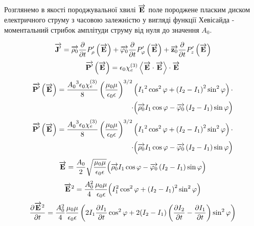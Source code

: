 Розглянемо в якості породжувальної хвилі $ \overrightarrow{\mathbf E} $ поле породжене 
пласким диском електричного струму з часовою залежністю у вигляді 
функції Хевісайда - моментальний стрибок амплітуди струму від нуля до 
значення $ A_0 $.

\textcolor{blue}{ \begin{equation*} 
\overrightarrow{\mathbf J^\prime} = 
\overrightarrow{\mathbf \rho_0}    \frac{\partial }{\partial t} P_\rho^\prime    \left( \overrightarrow{\mathbf E} \right) + 
\overrightarrow{\mathbf \varphi_0} \frac{\partial }{\partial t} P_\varphi^\prime \left( \overrightarrow{\mathbf E} \right) + 
\overrightarrow{\mathbf z_0}       \frac{\partial }{\partial t} P_z^\prime       \left( \overrightarrow{\mathbf E} \right) 
\end{equation*} }
%
\textcolor{blue}{ \begin{equation*}
\overrightarrow{\mathbf P^\prime} \left( \overrightarrow{\mathbf E} \right) = \epsilon_0 \chi_e^{(3)} 
\left<  \overrightarrow{\mathbf E}  \cdot  \overrightarrow{\mathbf E}  \right> \cdot \overrightarrow{\mathbf E} 
\end{equation*} }
%
\textcolor{blue}{ \begin{equation*} \begin{aligned}
\overrightarrow{\mathbf P^\prime} \left( \overrightarrow{\mathbf E} \right) = 
\frac{ {A_0}^3 \epsilon_0 \chi_e^{(3)} }{ 8 } \left( \frac{\mu_0 \mu}
{\epsilon_0 \epsilon} \right)^{3/2} \left( {I_1}^2 \cos^2 \varphi + 
\left( I_2 - I_1 \right)^2 \sin^2 \varphi \right) \cdot \\ 
\cdot \Big( \overrightarrow{\mathbf \rho_0} I_1 \cos \varphi - 
\overrightarrow{\mathbf  \varphi_0 } \left( I_2 - I_1 \right) \sin \varphi \Big)
\end{aligned} \end{equation*} }
%
\textcolor{blue}{ \begin{equation*} \begin{aligned}
\overrightarrow{\mathbf P^\prime} \left( \overrightarrow{\mathbf E} \right) = 
\frac{ {A_0}^3 \epsilon_0 \chi_e^{(3)} }{ 8 } \left( \frac{\mu_0 \mu}
{\epsilon_0 \epsilon} \right)^{3/2} \left( {I_1}^2 \cos^2 \varphi + 
\left( I_2 - I_1 \right)^2 \sin^2 \varphi \right) \cdot \\ 
\cdot \Big( \overrightarrow{\mathbf \rho_0} I_1 \cos \varphi - 
\overrightarrow{\mathbf  \varphi_0 } \left( I_2 - I_1 \right) \sin \varphi \Big)
\end{aligned} \end{equation*} }
%
\textcolor{blue}{ \begin{equation*}
\overrightarrow{\mathbf E} = \frac{A_0}{2} \sqrt{\frac{\mu_0 \mu}{\epsilon_0 \epsilon}}
\Big( \overrightarrow{\mathbf \rho_0} I_1 \cos \varphi - 
\overrightarrow{\mathbf  \varphi_0 } \left( I_2 - I_1 \right) \sin \varphi \Big)
\end{equation*} }
%
\textcolor{blue}{ \begin{equation*} \begin{aligned}
\overrightarrow{\mathbf E}^2 = \frac{A_0^2}{4} \frac{\mu_0 \mu}{\epsilon_0 \epsilon}
\Big( I_1^2 \cos^2 \varphi + \left( I_2 - I_1 \right)^2 \sin^2 \varphi \Big)
\end{aligned} \end{equation*} }
%
\textcolor{blue}{ \begin{equation*} \begin{aligned}
\frac{\partial  \overrightarrow{\mathbf E}^2 }{\partial t} = \frac{A_0^2}{4} 
\frac{\mu_0 \mu}{\epsilon_0 \epsilon}
\left( 2 I_1 \frac{\partial I_1}{\partial t} \cos^2 \varphi + 
2 ( I_2 - I_1 ) \left( \frac{\partial I_2}{\partial t} - \frac{\partial I_1}{\partial t} \right) 
\sin^2 \varphi \right)
\end{aligned} \end{equation*} }

